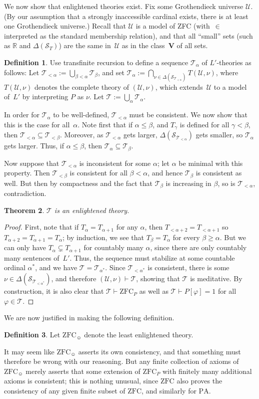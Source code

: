 \documentclass[12pt]{article}
\newcommand{\vp}{\varphi}
\newcommand{\RR}{\mathbb{R}}
\newcommand{\zfc}{\mathrm{ZFC}}
\newcommand{\zfcp}{{\zfc_P}}
\newcommand{\zfch}{{\zfc_{\smiley}}}
\newcommand{\pa}{\mathrm{PA}}
\newcommand{\cL}{L'}
\newcommand{\cS}{\mathcal{S}}
\newcommand{\cT}{\mathcal{T}}
\newcommand{\cU}{\mathcal{U}}
\theoremstyle{plain}
\newtheorem{theorem}{Theorem}[subsection]
\theoremstyle{definition}
\newtheorem{definition}[theorem]{Definition}
\theoremstyle{remark}
\begin{document}
We now show that enlightened theories exist.
Fix some Grothendieck universe $\cU$. (By our assumption that a strongly inaccessible cardinal exists, there is at least one Grothendieck universe.) Recall that $\cU$ is a model of ZFC (with~$\in$ interpreted as the standard membership relation), and that all ``small'' sets (such as $\RR$ and $\Delta(\cS_T)$) are the same in~$\cU$ as in the class~$\mathbf{V}$ of all sets.
\begin{definition}
Use transfinite recursion to define a sequence $\cT_\alpha$ of $\cL$-theories as follows: Let $\cT_{<\alpha} := \bigcup_{\beta<\alpha} \cT_\beta$, and set $\cT_\alpha := \bigcap_{\nu\in\Delta(\cS_{\cT_{<\alpha}})} T(\cU,\nu)$, where $T(\cU,\nu)$ denotes the complete theory of $(\cU,\nu)$, which extends~$\cU$ to a model of~$\cL$ by interpreting $P$ as $\nu$.
Let $\cT := \bigcup_\alpha \cT_\alpha$.
\end{definition}
In order for $\cT_\alpha$ to be well-defined, $\cT_{<\alpha}$ must be consistent. We now show that this is the case for all~$\alpha$.
Note first that if $\alpha\le\beta$, and $T_\gamma$ is defined for all $\gamma<\beta$, then $\cT_{<\alpha}\subseteq\cT_{<\beta}$. Moreover, as $\cT_{<\alpha}$ gets larger, $\Delta(\cS_{\cT_{<\alpha}})$ gets smaller, so $\cT_\alpha$ gets larger. Thus, if $\alpha\le\beta$, then $\cT_\alpha\subseteq\cT_\beta$.

Now suppose that $\cT_{<\alpha}$ is inconsistent for some $\alpha$; let $\alpha$ be minimal with this property. Then $\cT_{<\beta}$ is consistent for all $\beta<\alpha$, and hence $\cT_\beta$ is consistent as well. But then by compactness and the fact that $\cT_\beta$ is increasing in $\beta$, so is $\cT_{<\alpha}$, contradiction.
\begin{theorem}
$\cT$ is an enlightened theory.
\end{theorem}
\begin{proof}
First, note that if $T_{\alpha}= T_{\alpha+1}$ for any $\alpha$, then $T_{<\alpha+2} = T_{<\alpha+1}$ so $T_{\alpha+2} = T_{\alpha+1} = T_\alpha$; by induction, we see that $T_\beta = T_\alpha$ for every $\beta\ge\alpha$. But we can only have $T_{\alpha}\subsetneq T_{\alpha+1}$ for countably many $\alpha$, since there are only countably many sentences of~$\cL$. Thus, the sequence must stabilize at some countable ordinal $\alpha^*$, and we have $\cT = \cT_{\alpha^*}$. Since $\cT_{<\alpha^*}$ is consistent, there is some $\nu\in\Delta(\cS_{\cT_{<\alpha^*}})$, and therefore $(\cU,\nu)\vdash\cT$, showing that $\cT$ is meditative. By construction, it is also clear that $\cT\vdash\zfcp$ as well as $\cT\vdash P[\vp]=1$ for all $\vp\in\cT$.
\end{proof}
We are now justified in making the following definition.
\begin{definition}
Let $\zfch$ denote the least enlightened theory.
\end{definition}
It may seem like $\zfch$ asserts its own consistency, and that something must therefore be wrong with our reasoning. But any finite collection of axioms of $\zfch$ merely asserts that some extension of $\zfcp$ with finitely many additional axioms is consistent; this is nothing unusual, since $\zfc$ also proves the consistency of any given finite subset of $\zfc$, and similarly for $\pa$.
\end{document}
